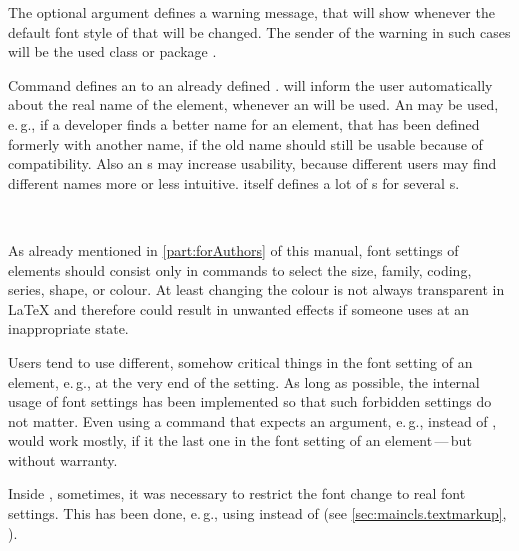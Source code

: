 The optional argument  defines a warning message,
that \KOMAScript{} will show whenever the default font style of that
 will be changed. The sender of the warning in such cases will
be the used \KOMAScript{} class or package .

Command  defines an  to an already
defined . \KOMAScript{} will inform the user automatically
about the real name of the element, whenever an  will be
used. An  may be used, e.\,g., if a
developer finds a better name for an element, that has been defined formerly
with another name, if the old name should still be usable because of
compatibility. Also an s may increase usability, because
different users may find different names more or less intuitive. \KOMAScript{}
itself defines a lot of s for several s.
%
%
%

\begin{Declaration}
  \\
\end{Declaration}
%
%
As already mentioned in \autoref{part:forAuthors} of this manual, font
settings of elements should consist only in commands to select the size, family,
coding, series, shape, or colour. At least changing the colour is not always
transparent in \LaTeX{} and therefore could result in unwanted effects if
someone uses  at an inappropriate state.

Users tend to use different, somehow critical things in the font setting of an
element, e.\,g.,  at the very end of the setting. As long
as possible, the internal usage of font settings has been implemented so that
such forbidden settings do not matter. Even using a command that expects an
argument, e.\,g.,  instead of ,  would work
mostly, if it the last one in the font setting of an element\,---\,but without
warranty.

Inside \KOMAScript, sometimes, it was necessary to restrict the font change
to real font settings. This has been done, e.\,g., using
%
%
%
%
 instead of  (see
\autoref{sec:maincls.textmarkup},
).

